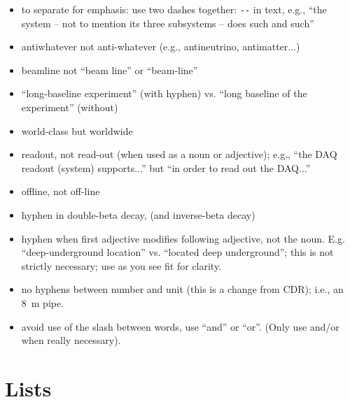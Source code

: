 \begin{itemize}
\item to separate for emphasis: use two dashes together: \verb|--| in text, e.g.,  ``the system -- not to mention its three subsystems -- does such and such'' 
\item antiwhatever not anti-whatever (e.g., antineutrino, antimatter...)
\item beamline not ``beam line'' or ``beam-line'' 
\item ``long-baseline experiment''  (with hyphen) vs. ``long baseline of the experiment'' (without)
\item world-class but worldwide   
\item readout, not read-out (when used as a noun or adjective); e.g., ``the DAQ readout (system) supports...'' but ``in order to read out the DAQ...''
\item offline, not off-line
\item hyphen in double-beta decay, (and inverse-beta decay)
\item hyphen when first adjective modifies following adjective, not the noun. E.g. ``deep-underground location'' vs. ``located deep underground'';  this is not strictly necessary; use as you see fit for clarity.
\item no hyphens between number and unit (this is a change from CDR); i.e., an \SI{8}{\meter} pipe.
\item avoid use of the slash between words, use ``and'' or ``or''. (Only use and/or when really necessary).
\end{itemize}

\section{Lists}
\label{sec:english-lists}

